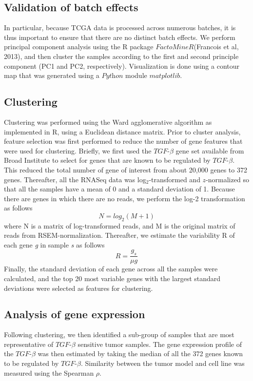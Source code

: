 \documentclass[a4paper,12pt]{article}
\begin{document}
\subsection{Validation  of batch effects}
In particular, because TCGA data is processed across numerous batches,
it is thus important to ensure that there are no distinct batch
effects. We perform principal component analysis using the R package
$\textit{FactoMineR}$(Francois et al, 2013), and then cluster the
samples according to the first and second principle component (PC1 and PC2,
respectively). Visualization is done using a contour map that was
generated using a $\textit{Python}$ module $\textit{matplotlib}$.

\subsection{Clustering}
Clustering was performed using the Ward agglomerative algorithm as
implemented in R, using a Euclidean distance matrix.
Prior to cluster analysis, feature selection was first performed to
reduce the number of gene features that were used for
clustering. Briefly, we first used the $\textit{TGF}$-$\beta$ gene set
available from Broad Institute to select for genes that are known to
be regulated by $\textit{TGF}$-$\beta$. This reduced the total number
of gene of interest from about 20,000 genes to 372 genes. Thereafter,
all the RNASeq data was log$_2$-transformed and
$\textit{z}$-normalized so that all the samples have a mean of 0 and a
standard deviation of 1. Because there are genes in which there are no
reads, we perform the log-2 transformation as follows \begin{equation} N =
log_2(M+1)\end{equation} where N is a matrix of log-transformed reads, and M is
the original matrix of reads from RSEM-normalization. Thereafter, we
estimate the variability R of each gene \textit{g} in sample
\textit{s} as follows \begin{equation} R= \frac{\textit{g}_s}{\mu \textit{g}} \end{equation}Finally, the standard deviation of each gene across all the samples
were calculated, and the top 20 most variable genes with the largest
standard deviations were selected as features for clustering.

\subsection{Analysis of gene expression}
Following clustering, we then identified a sub-group of samples that
are most representative of $\textit{TGF}$-$\beta$ sensitive tumor
samples. The gene expression profile of the $\textit{TGF}$-$\beta$ was
then estimated by taking the median of all the 372 genes known to be
regulated by $\textit{TGF}$-$\beta$. Similarity between the tumor
model and cell line was measured using the Spearman $\rho$.
\end{document}
